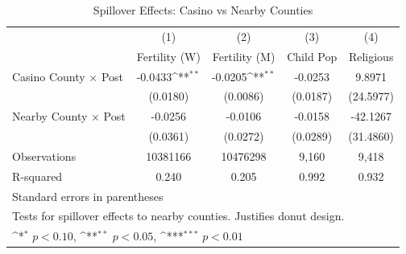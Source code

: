 \begin{table}[htbp]\centering
\scriptsize
\def\sym#1{\ifmmode^{#1}\else\(^{#1}\)\fi}
\caption{Spillover Effects: Casino vs Nearby Counties}
\begin{tabular}{l*{4}{c}}
\hline\hline
            &\multicolumn{1}{c}{(1)}&\multicolumn{1}{c}{(2)}&\multicolumn{1}{c}{(3)}&\multicolumn{1}{c}{(4)}\\
            &\multicolumn{1}{c}{Fertility (W)}&\multicolumn{1}{c}{Fertility (M)}&\multicolumn{1}{c}{Child Pop}&\multicolumn{1}{c}{Religious}\\
\hline
Casino County × Post&     -0.0433\sym{**} &     -0.0205\sym{**} &     -0.0253         &      9.8971         \\
            &    (0.0180)         &    (0.0086)         &    (0.0187)         &   (24.5977)         \\
[1em]
Nearby County × Post&     -0.0256         &     -0.0106         &     -0.0158         &    -42.1267         \\
            &    (0.0361)         &    (0.0272)         &    (0.0289)         &   (31.4860)         \\
\hline
Observations&    10381166         &    10476298         &       9,160         &       9,418         \\
R-squared   &       0.240         &       0.205         &       0.992         &       0.932         \\
\hline\hline
\multicolumn{5}{l}{\footnotesize Standard errors in parentheses}\\
\multicolumn{5}{l}{\footnotesize Tests for spillover effects to nearby counties. Justifies donut design.}\\
\multicolumn{5}{l}{\footnotesize \sym{*} \(p<0.10\), \sym{**} \(p<0.05\), \sym{***} \(p<0.01\)}\\
\end{tabular}
\end{table}